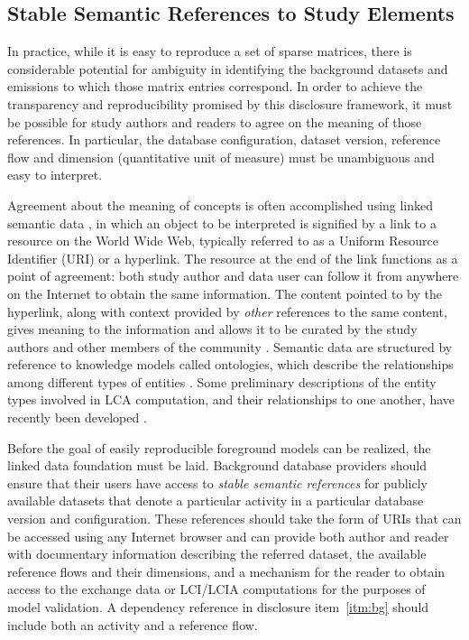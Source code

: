 \subsection{Stable Semantic References to Study Elements}

In practice, while it is easy to reproduce a set of sparse matrices, there is considerable potential for ambiguity
in identifying the background datasets and emissions to which those matrix entries correspond.
In order to achieve the transparency and reproducibility promised by this disclosure framework, it must be possible for study authors and readers to agree on the meaning of those references.  In particular, the database configuration, dataset version, reference flow and dimension (quantitative unit of measure) must be unambiguous and easy to interpret.

Agreement about the meaning of concepts is often accomplished using linked semantic data \citep{Bizer_2009}, in which an object to be interpreted is signified by a link to a resource on the World Wide Web, typically referred to as a Uniform Resource Identifier (URI) or a hyperlink.  The resource at the end of the link functions as a point of agreement: both study author and data user can follow it from anywhere on the Internet to obtain the same information.  The content pointed to by the hyperlink, along with context provided by \emph{other} references to the same content, gives meaning to the information and allows it to be curated by the study authors and other members of the community \citep{Khan_2011}.   Semantic data are structured by reference to knowledge models called ontologies, which describe the relationships among different types of entities \citep{Madin2008}.  Some preliminary descriptions of the entity types involved in LCA computation, and their relationships to one another, have recently been developed \citep{Ciroth_Srocka_2014, Janowicz_WOP_2015, Kuczenski_JCP_2016}.

Before the goal of easily reproducible foreground models can be realized, the linked data foundation must be laid.  Background database providers should ensure that their users have access to \emph{stable semantic references} for publicly available datasets that denote a particular activity in a particular database version and configuration.  These references should take the form of URIs that can be accessed using any Internet browser and can provide both author and reader with documentary information describing the referred dataset, the available reference flows and their dimensions, and a mechanism for the reader to obtain access to the exchange data or LCI/LCIA computations for the purposes of model validation.  A dependency reference in disclosure item~\ref{itm:bg} should include both an activity and a reference flow.

